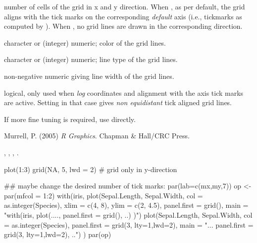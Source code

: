 %
\begin{Arguments}
\begin{ldescription}
\item[\code{nx,ny}] number of cells of the grid in x and y direction.  When
, as per default, the grid aligns with the tick marks on
the corresponding \emph{default} axis (i.e., tickmarks as computed by
).  When , no grid lines are
drawn in the corresponding direction.
\item[\code{col}] character or (integer) numeric; color of the grid lines.
\item[\code{lty}] character or (integer) numeric; line type of the grid lines.
\item[\code{lwd}] non-negative numeric giving line width of the grid lines.
\item[\code{equilogs}] logical, only used when \emph{log} coordinates and
alignment with the axis tick marks are active.  Setting  in that case gives \emph{non equidistant} tick aligned
grid lines.
\end{ldescription}
\end{Arguments}
%
\begin{Note}\relax
If more fine tuning is required, use 
directly.
\end{Note}
%
\begin{References}\relax
Murrell, P. (2005) \emph{R Graphics}. Chapman \& Hall/CRC Press.
\end{References}
%
\begin{SeeAlso}\relax
{}, , ,
.
\end{SeeAlso}
%
\begin{Examples}
\begin{ExampleCode}
plot(1:3)
grid(NA, 5, lwd = 2) # grid only in y-direction

## maybe change the desired number of tick marks:  par(lab=c(mx,my,7))
op <- par(mfcol = 1:2)
with(iris,
     {
     plot(Sepal.Length, Sepal.Width, col = as.integer(Species),
          xlim = c(4, 8), ylim = c(2, 4.5), panel.first = grid(),
          main = "with(iris,  plot(...., panel.first = grid(), ..) )")
     plot(Sepal.Length, Sepal.Width, col = as.integer(Species),
          panel.first = grid(3, lty=1,lwd=2),
          main = "... panel.first = grid(3, lty=1,lwd=2), ..")
     }
    )
par(op)

\end{ExampleCode}
\end{Examples}
